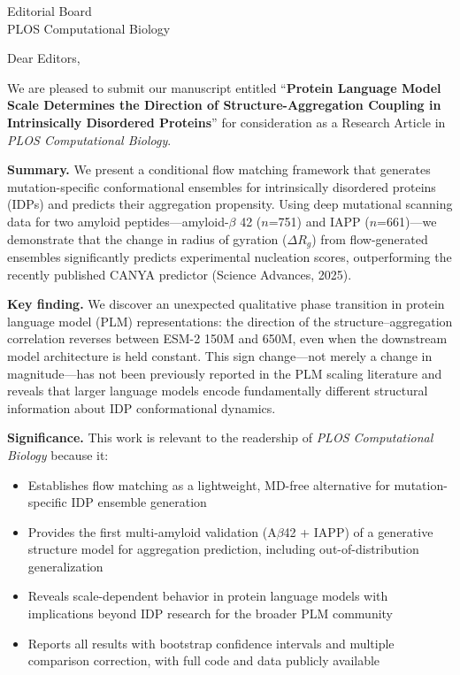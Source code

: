 \documentclass[11pt]{letter}
\begin{document}
\begin{letter}{Editorial Board \\ PLOS Computational Biology}

\opening{Dear Editors,}

We are pleased to submit our manuscript entitled ``\textbf{Protein Language Model Scale Determines the Direction of Structure-Aggregation Coupling in Intrinsically Disordered Proteins}'' for consideration as a Research Article in \textit{PLOS Computational Biology}.

\textbf{Summary.} We present a conditional flow matching framework that generates mutation-specific conformational ensembles for intrinsically disordered proteins (IDPs) and predicts their aggregation propensity. Using deep mutational scanning data for two amyloid peptides---amyloid-$\beta$ 42 ($n$=751) and IAPP ($n$=661)---we demonstrate that the change in radius of gyration ($\Delta R_g$) from flow-generated ensembles significantly predicts experimental nucleation scores, outperforming the recently published CANYA predictor (Science Advances, 2025).

\textbf{Key finding.} We discover an unexpected qualitative phase transition in protein language model (PLM) representations: the direction of the structure--aggregation correlation reverses between ESM-2 150M and 650M, even when the downstream model architecture is held constant. This sign change---not merely a change in magnitude---has not been previously reported in the PLM scaling literature and reveals that larger language models encode fundamentally different structural information about IDP conformational dynamics.

\textbf{Significance.} This work is relevant to the readership of \textit{PLOS Computational Biology} because it:

\begin{itemize}
    \item Establishes flow matching as a lightweight, MD-free alternative for mutation-specific IDP ensemble generation
    \item Provides the first multi-amyloid validation (A$\beta$42 + IAPP) of a generative structure model for aggregation prediction, including out-of-distribution generalization
    \item Reveals scale-dependent behavior in protein language models with implications beyond IDP research for the broader PLM community
    \item Reports all results with bootstrap confidence intervals and multiple comparison correction, with full code and data publicly available
\end{itemize}


\end{letter}
\end{document}
